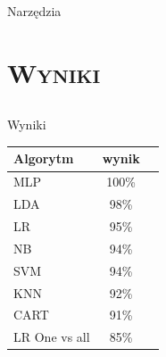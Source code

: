 \documentclass[xcolor=x11names,compress]{beamer}
\renewcommand{\(}{\begin{columns}}
\renewcommand{\)}{\end{columns}}
\newcommand{\<}[1]{\begin{column}{#1}}
\renewcommand{\>}{\end{column}}
\begin{document}
\begin{frame}{Narzędzia}
\begin{itemize}
{\begin{figure}
                   \end{figure}				
			}
	\end{itemize}
\end{frame}

\section{\scshape Wyniki}
\subsection{}
\begin{frame}{Wyniki}

    \begin{table}[t]
    \begin{tabular}{|l|c|c|}
      \hline 
      Algorytm &  wynik \\
      \hline
      MLP & 100\% \\
      \hline
      LDA & 98\% \\
      \hline
      LR & 95\% \\
      \hline
      NB & 94\% \\
      \hline
      SVM & 94\% \\
      \hline
      KNN & 92\% \\
      \hline
      CART & 91\% \\
      \hline
      LR One vs all & 85\% \\
      \hline
    \end{tabular} \\
    \end{table}
	
\end{frame}
\end{document}
